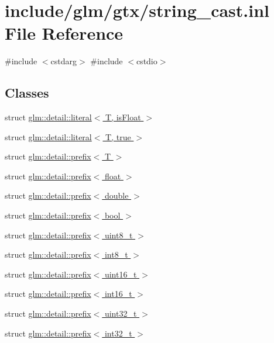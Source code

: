 \hypertarget{string__cast_8inl}{}\section{include/glm/gtx/string\+\_\+cast.inl File Reference}
\label{string__cast_8inl}
{\ttfamily \#include $<$cstdarg$>$}\newline
{\ttfamily \#include $<$cstdio$>$}\newline
\subsection*{Classes}
\begin{DoxyCompactItemize}
\item 
struct \hyperlink{structglm_1_1detail_1_1literal}{glm\+::detail\+::literal$<$ T, is\+Float $>$}
\item 
struct \hyperlink{structglm_1_1detail_1_1literal_3_01T_00_01true_01_4}{glm\+::detail\+::literal$<$ T, true $>$}
\item 
struct \hyperlink{structglm_1_1detail_1_1prefix}{glm\+::detail\+::prefix$<$ T $>$}
\item 
struct \hyperlink{structglm_1_1detail_1_1prefix_3_01float_01_4}{glm\+::detail\+::prefix$<$ float $>$}
\item 
struct \hyperlink{structglm_1_1detail_1_1prefix_3_01double_01_4}{glm\+::detail\+::prefix$<$ double $>$}
\item 
struct \hyperlink{structglm_1_1detail_1_1prefix_3_01bool_01_4}{glm\+::detail\+::prefix$<$ bool $>$}
\item 
struct \hyperlink{structglm_1_1detail_1_1prefix_3_01uint8__t_01_4}{glm\+::detail\+::prefix$<$ uint8\+\_\+t $>$}
\item 
struct \hyperlink{structglm_1_1detail_1_1prefix_3_01int8__t_01_4}{glm\+::detail\+::prefix$<$ int8\+\_\+t $>$}
\item 
struct \hyperlink{structglm_1_1detail_1_1prefix_3_01uint16__t_01_4}{glm\+::detail\+::prefix$<$ uint16\+\_\+t $>$}
\item 
struct \hyperlink{structglm_1_1detail_1_1prefix_3_01int16__t_01_4}{glm\+::detail\+::prefix$<$ int16\+\_\+t $>$}
\item 
struct \hyperlink{structglm_1_1detail_1_1prefix_3_01uint32__t_01_4}{glm\+::detail\+::prefix$<$ uint32\+\_\+t $>$}
\item 
struct \hyperlink{structglm_1_1detail_1_1prefix_3_01int32__t_01_4}{glm\+::detail\+::prefix$<$ int32\+\_\+t $>$}

\end{DoxyCompactItemize}
